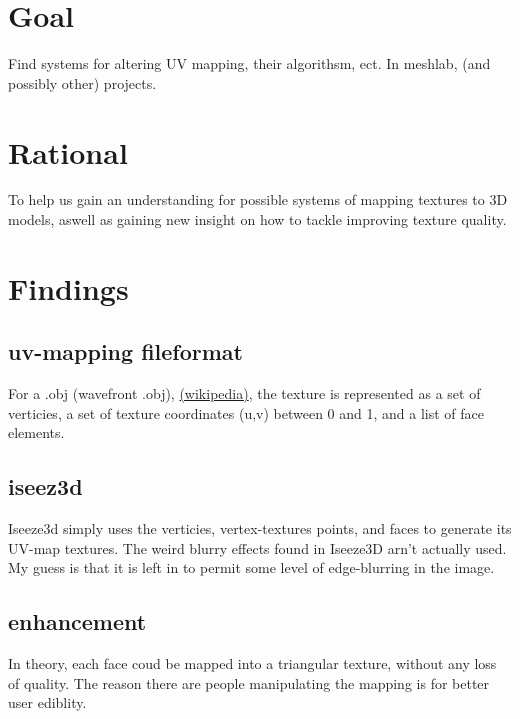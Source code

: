 

\usepackage{hyperref}




\section{Goal}

Find systems for altering UV mapping, their algorithsm, ect. In meshlab, (and possibly other) projects.

\section{Rational}

To help us gain an understanding for possible systems of mapping textures to 3D models, aswell as gaining new insight on how to tackle improving texture quality.

\section{Findings}

\subsection{uv-mapping fileformat}
For a .obj (wavefront .obj), \href{https://en.wikipedia.org/wiki/Wavefront_.obj_file}{(wikipedia)}, the texture is represented as a set of verticies, a set of texture coordinates (u,v) between 0 and 1, and a list of face elements.

\subsection{iseez3d}
Iseeze3d simply uses the verticies, vertex-textures points, and faces to generate its UV-map textures. The weird blurry effects found in Iseeze3D arn't actually used. My guess is that it is left in to permit some level of edge-blurring in the image.

\subsection{enhancement}
In theory, each face coud be mapped into a triangular texture, without any loss of quality. The reason there are people manipulating the mapping is for better user ediblity.

 

